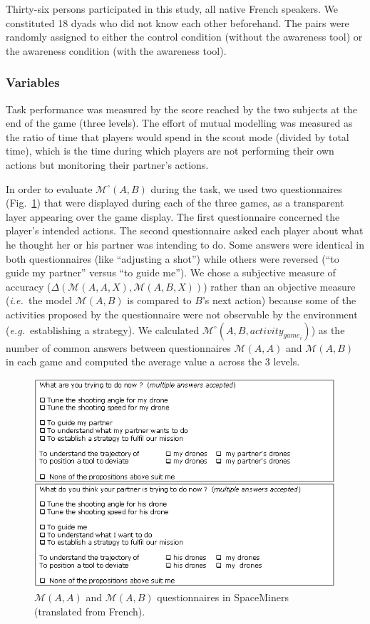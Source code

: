 \documentclass[natbib]{svjour3}
\newcommand{\ie}{{\textit{i.e.\ }}}
\newcommand{\eg}{{\textit{e.g.\ }}}
\newcommand{\M}[3]{{\mathcal{M}(#1, #2, #3)}}
\newcommand{\gmodel}[2]{{$\mathcal{M}(#1, #2)$}}
\newcommand{\Model}[3]{{$\mathcal{M}^{\circ}(#1, #2, #3)$}}
\newcommand{\gModel}[2]{{$\mathcal{M}^{\circ}(#1, #2)$}}
\begin{document}
Thirty-six persons participated in this study, all native French speakers. We
constituted 18 dyads who did not know each other beforehand. The pairs were
randomly assigned to either the control condition (without the awareness tool)
or the awareness condition (with the awareness tool).

\subsubsection*{Variables}

Task performance was measured by the score reached by the two subjects at the
end of the game (three levels). The effort of mutual modelling was measured as
the ratio of time that players would spend in the scout mode (divided by total
time), which is the time during which players are not performing their own
actions but monitoring their partner's actions.

In order to evaluate \gModel{A}{B} during the task, we used two questionnaires
(Fig.~\ref{study1:questionnaires}) that were displayed during each of the three
games, as a transparent layer appearing over the game display. The first
questionnaire concerned the player's intended actions. The second questionnaire
asked each player about what he thought her or his partner was intending to do.
Some answers were identical in both questionnaires (like ``adjusting a shot'')
while others were reversed (``to guide my partner'' versus ``to guide me''). We
chose a subjective measure of accuracy ($\Delta(\M{A}{A}{X}, \M{A}{B}{X})$)
rather than an objective measure (\ie the model \gmodel{A}{B} is compared to $B$'s
next action) because some of the activities proposed by the questionnaire were not
observable by the environment (\eg establishing a strategy). We calculated
\Model{A}{B}{activity_{game_{i}}}) as the number of common answers between
questionnaires \gmodel{A}{A} and \gmodel{A}{B} in each game and computed the
average value a across the 3 levels.

\begin{figure}[ht!]
        \centering
        \includegraphics[width=\columnwidth]{image5.png}
        \caption{\gmodel{A}{A} and \gmodel{A}{B} questionnaires in SpaceMiners
        (translated from French).}

        \label{study1:questionnaires}
\end{figure}
\end{document}
